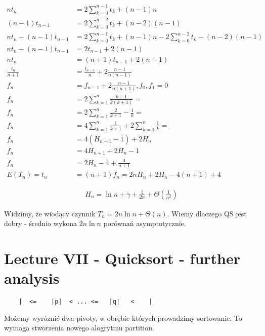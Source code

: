 \documentclass{article}
\begin{document}
\begin{align}
    n t_n &= 2 \sum_{k=0}^{n-1} t_k + (n-1)n\\
    (n-1) t_{n-1} &= 2 \sum_{k=0}^{n-2} t_k + (n-2)(n-1)\\
    n t_n - (n-1) t_{n-1} &= 2 \sum_{k=0}^{n-1} t_k + (n-1)n - 2 \sum_{k=0}^{n-2} t_k - (n-2)(n-1)\\
    n t_n - (n-1) t_{n-1} &= 2 t_{n-1} + 2 (n-1)\\
    n t_n &= (n+1) t_{n-1} + 2(n-1)\\
    \frac{t_n}{n+1} &= \frac{t_{n-1}}{n} + 2\frac{n-1}{n(n-1)}\\
    f_n &= f_{n-1} + 2\frac{n-1}{n(n+1)}, f_0, f_1 = 0\\
    f_n &= 2 \sum_{k=1}^{n} \frac{k-1}{k(k+1)} =\\
    f_n &= 2 \sum_{k=1}^{n} \frac{2}{k+1} - \frac{1}{k}=\\
    f_n &= 4 \sum_{k=1}^{n} \frac{1}{k+1} + 2\sum_{k=1}^{n} \frac{1}{k}=\\
    f_n &= 4 (H_{n+1} - 1) + 2 H_n\\
    f_n &= 4H_{n+1} + 2H_n - 1\\
    f_n &= 2H_{n} - 4 + \frac{4}{n+1}\\
    E(T_n) = t_n &= (n+1)f_n = 2nH_n + 2H_n - 4(n+1) + 4
\end{align}

\begin{align}
    H_n = \ln n + \gamma + \frac{1}{2n} + \Theta\left(\frac{1}{n^2}\right)
\end{align}

Widzimy, że wiodący czynnik $T_n = 2n\ln n + \Theta(n)$.
Wiemy dlaczego QS jest dobry - średnio wykona $2n\ln n$ porównań asymptotycznie.

\section{Lecture VII - Quicksort - further analysis}

\begin{verbatim}
    |  <=    |p|  < ... <=   |q|   <    |
\end{verbatim}

Możemy wyróznić dwa pivoty, w obrębie których prowadzimy sortowanie. 
To wymaga stworzenia nowego alogrytmu partition. 
\end{document}
